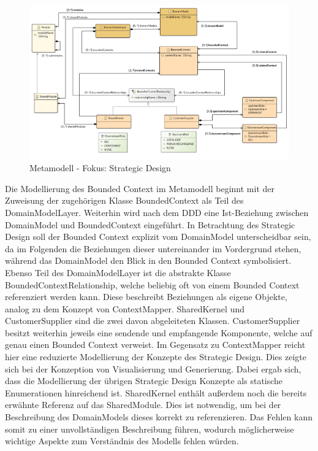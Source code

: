 \begin{figure}[ht]
\centering
\includegraphics[width=\textwidth]{bilder/k4/4.png}
\caption{Metamodell - Fokus: Strategic Design}
\end{figure}

Die Modellierung des Bounded Context im Metamodell beginnt mit der Zuweisung der zugehörigen Klasse \glqq BoundedContext\grqq{} als Teil des DomainModelLayer. Weiterhin wird nach dem DDD eine Ist-Beziehung zwischen DomainModel und BoundedContext eingeführt. In Betrachtung des Strategic Design soll der Bounded Context explizit vom DomainModel unterscheidbar sein, da im Folgenden die Beziehungen dieser untereinander im Vordergrund stehen, während das DomainModel den Blick in den Bounded Context symbolisiert. Ebenso Teil des DomainModelLayer ist die abstrakte Klasse \glqq BoundedContextRelationship\grqq, welche beliebig oft von einem Bounded Context referenziert werden kann. Diese beschreibt Beziehungen als eigene Objekte, analog zu dem Konzept von ContextMapper. \glqq SharedKernel\grqq{} und \glqq CustomerSupplier\grqq{} sind die zwei davon abgeleiteten Klassen. CustomerSupplier besitzt weiterhin jeweils eine sendende und empfangende Komponente, welche auf genau einen Bounded Context verweist. Im Gegensatz zu ContextMapper reicht hier eine reduzierte Modellierung der Konzepte des Strategic Design. Dies zeigte sich bei der Konzeption von Visualisierung und Generierung. Dabei ergab sich, dass die Modellierung der übrigen Strategic Design Konzepte als statische Enumerationen hinreichend ist. SharedKernel enthält außerdem noch die bereits erwähnte Referenz auf das SharedModule. Dies ist notwendig, um bei der Beschreibung des DomainModels dieses korrekt zu referenzieren. Das Fehlen kann somit zu einer unvollständigen Beschreibung führen, wodurch möglicherweise wichtige Aspekte zum Verständnis des Modells fehlen würden.


